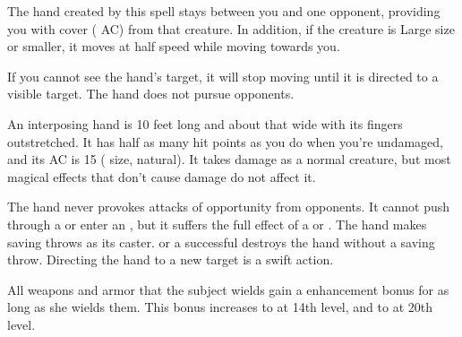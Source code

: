 \spellrng{\rngmed}
\begin{spelleffect}
  The hand created by this spell stays between you and one opponent, providing you with cover ( AC) from that creature. In addition, if the creature is Large size or smaller, it moves at half speed while moving towards you. 
  \par If you cannot see the hand's target, it will stop moving until it is directed to a visible target. The hand does not pursue opponents.
  \par An interposing hand is 10 feet long and about that wide with its fingers outstretched. It has half as many hit points as you do when you're undamaged, and its AC is 15 ( size,  natural). It takes damage as a normal creature, but most magical effects that don't cause damage do not affect it.
\end{spelleffect}
\begin{spellnotes}
  \par The hand never provokes attacks of opportunity from opponents. It cannot push through a  or enter an , but it suffers the full effect of a  or . The hand makes saving throws as its caster.
   or a successful  destroys the hand without a saving throw. Directing the hand to a new target is a swift action.
\end{spellnotes}

\spellrng{\rngclose}
\spelldur{\durshort}
\begin{spelleffect}
  All weapons and armor that the subject wields gain a  enhancement bonus for as long as she wields them. This bonus increases to  at 14th level, and to  at 20th level.
\end{spelleffect}

